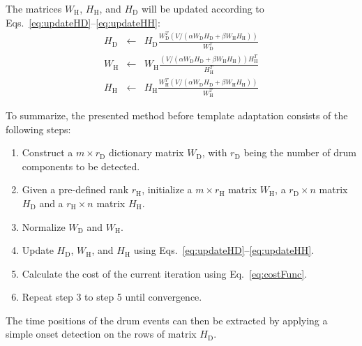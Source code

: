 \documentclass{article}
\begin{document}
The matrices  $W_\mathrm{H}$, $H_\mathrm{H}$, and $H_\mathrm{D}$ will be updated according to \mbox{Eqs.~\eqref{eq:updateHD}--\eqref{eq:updateHH}}: 
%
\begin{eqnarray}
\label{eq:updateHD}
H_\mathrm{D} &\leftarrow& H_\mathrm{D}\frac{W_\mathrm{D}^T( V / (\alpha W_\mathrm{D}H_\mathrm{D} + \beta W_\mathrm{H}H_\mathrm{H}))}{W_\mathrm{D}^T}\\
%
\label{eq:updateWH}
W_\mathrm{H} &\leftarrow& W_\mathrm{H}\frac{(V/(\alpha W_\mathrm{D}H_\mathrm{D} + \beta W_\mathrm{H}H_\mathrm{H})) H_\mathrm{H}^T}{H_\mathrm{H}^T}\\
%
\label{eq:updateHH}
H_\mathrm{H} &\leftarrow& H_\mathrm{H}\frac{W_\mathrm{H}^T (V/(\alpha W_\mathrm{D}H_\mathrm{D} + \beta W_\mathrm{H}H_\mathrm{H}))}{W_\mathrm{H}^T}
\end{eqnarray}

To summarize, the presented method before template adaptation consists of the following steps:
\begin{enumerate}
    \item   Construct a $m \times r_\mathrm{D}$ dictionary matrix $W_\mathrm{D}$, with $r_\mathrm{D}$ being the number of drum components to be detected.
    \item   Given a pre-defined rank $r_\mathrm{H}$, initialize a $m \times r_\mathrm{H}$ matrix $W_\mathrm{H}$, a $r_\mathrm{D} \times n$ matrix $H_\mathrm{D}$ and a $r_\mathrm{H} \times n$ matrix $H_\mathrm{H}$.
    \item   Normalize $W_\mathrm{D}$ and $W_\mathrm{H}$. 
    \item   Update $H_\mathrm{D}$, $W_\mathrm{H}$, and $H_\mathrm{H}$ using Eqs.~\eqref{eq:updateHD}--\eqref{eq:updateHH}.
    \item   Calculate the cost of the current iteration using Eq.~\eqref{eq:costFunc}.
    \item   Repeat step 3 to step 5 until convergence.
\end{enumerate}
%
The time positions of the drum events can then be extracted by applying a simple onset detection on the rows of matrix $H_\mathrm{D}$.
\end{document}
